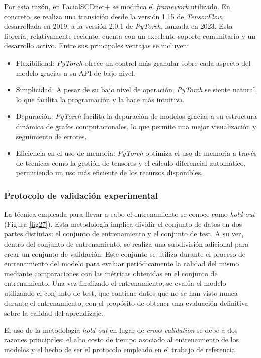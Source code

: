 Por esta razón, en FacialSCDnet+ se modifica el \textit{framework} utilizado. En concreto, se realiza una transición desde la versión 1.15 de \textit{TensorFlow}, desarrollada en 2019, a la versión 2.0.1 de \textit{PyTorch}, lanzada en 2023. Esta librería, relativamente reciente, cuenta con un excelente soporte comunitario y un desarrollo activo. Entre sus principales ventajas se incluyen:

\begin{itemize}
	\item Flexibilidad: \textit{PyTorch} ofrece un control más granular sobre cada aspecto del modelo gracias a su API de bajo nivel.
	\item Simplicidad: A pesar de su bajo nivel de operación, \textit{PyTorch} se siente natural, lo que facilita la programación y la hace más intuitiva.
	\item Depuración: \textit{PyTorch} facilita la depuración de modelos gracias a su estructura dinámica de grafos computacionales, lo que permite una mejor visualización y seguimiento de errores.
	\item Eficiencia en el uso de memoria: \textit{PyTorch} optimiza el uso de memoria a través de técnicas como la gestión de tensores y el cálculo diferencial automático, permitiendo un uso más eficiente de los recursos disponibles.
\end{itemize}


\subsubsection{Protocolo de validación experimental}\label{protocolo}

La técnica empleada para llevar a cabo el entrenamiento se conoce como \textit{hold-out} (Figura \ref{fig27}). Esta metodología implica dividir el conjunto de datos en dos partes distintas: el conjunto de entrenamiento y el conjunto de test. A su vez, dentro del conjunto de entrenamiento, se realiza una subdivisión adicional para crear un conjunto de validación. Este conjunto se utiliza durante el proceso de entrenamiento del modelo para evaluar periódicamente la calidad del mismo mediante comparaciones con las métricas obtenidas en el conjunto de entrenamiento. Una vez finalizado el entrenamiento, se evalúa el modelo utilizando el conjunto de test, que contiene datos que no se han visto nunca durante el entrenamiento, con el propósito de obtener una evaluación definitiva sobre la calidad del aprendizaje.

El uso de la metodología \textit{hold-out} en lugar de \textit{cross-validation} se debe a dos razones principales: el alto costo de tiempo asociado al entrenamiento de los modelos y el hecho de ser el protocolo empleado en el trabajo de referencia.

